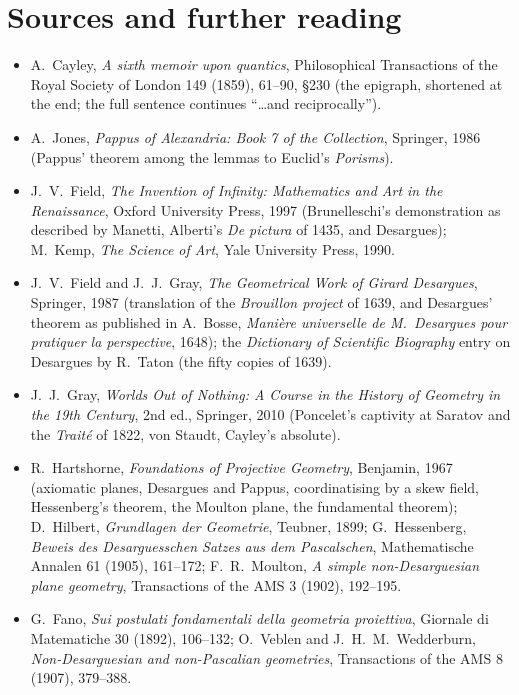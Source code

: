 \section*{Sources and further reading}

\begin{itemize}
\item A.~Cayley, \emph{A sixth memoir upon quantics}, Philosophical Transactions of the Royal Society of London 149 (1859), 61--90, \S230 (the
epigraph, shortened at the end; the full sentence continues ``\dots and reciprocally'').
\item A.~Jones, \emph{Pappus of Alexandria: Book 7 of the Collection}, Springer, 1986 (Pappus' theorem among the lemmas to Euclid's
\emph{Porisms}).
\item J.~V.~Field, \emph{The Invention of Infinity: Mathematics and Art in the Renaissance}, Oxford University Press, 1997 (Brunelleschi's
demonstration as described by Manetti, Alberti's \emph{De pictura} of 1435, and Desargues); M.~Kemp, \emph{The Science of Art}, Yale University
Press, 1990.
\item J.~V.~Field and J.~J.~Gray, \emph{The Geometrical Work of Girard Desargues}, Springer, 1987 (translation of the \emph{Brouillon project} of
1639, and Desargues' theorem as published in A.~Bosse, \emph{Mani\`ere universelle de M.~Desargues pour pratiquer la perspective}, 1648); the
\emph{Dictionary of Scientific Biography} entry on Desargues by R.~Taton (the fifty copies of 1639).
\item J.~J.~Gray, \emph{Worlds Out of Nothing: A Course in the History of Geometry in the 19th Century}, 2nd ed., Springer, 2010 (Poncelet's captivity at
Saratov and the \emph{Trait\'e} of 1822, von Staudt, Cayley's absolute).
\item R.~Hartshorne, \emph{Foundations of Projective Geometry}, Benjamin, 1967 (axiomatic planes, Desargues and Pappus, coordinatising by a skew
field, Hessenberg's theorem, the Moulton plane, the fundamental theorem); D.~Hilbert, \emph{Grundlagen der Geometrie}, Teubner, 1899;
G.~Hessenberg, \emph{Beweis des Desarguesschen Satzes aus dem Pascalschen}, Mathematische Annalen 61 (1905), 161--172; F.~R.~Moulton, \emph{A simple
non-Desarguesian plane geometry}, Transactions of the AMS 3 (1902), 192--195.
\item G.~Fano, \emph{Sui postulati fondamentali della geometria proiettiva}, Giornale di Matematiche 30 (1892), 106--132; O.~Veblen and
J.~H.~M.~Wedderburn, \emph{Non-Desarguesian and non-Pascalian geometries}, Transactions of the AMS 8 (1907), 379--388.

\end{itemize}
